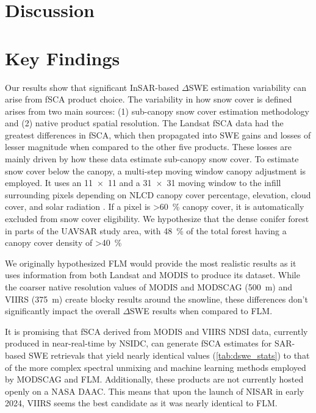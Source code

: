 \hypertarget{ch5-discussion}{\section{Discussion}\label{ch4-discussion}}
\hypertarget{ch5-discussion-1}{\section{Key Findings}\label{ch4-discussion}}

Our results show that significant InSAR-based $\Delta$SWE estimation variability can arise from fSCA product choice. The variability in how snow cover is defined arises from two main sources: (1) sub-canopy snow cover estimation methodology and (2) native product spatial resolution. The Landsat fSCA data had the greatest differences in fSCA, which then propagated into SWE gains and losses of lesser magnitude when compared to the other five products. These losses are mainly driven by how these data estimate sub-canopy snow cover. To estimate snow cover below the canopy, a multi-step moving window canopy adjustment is employed. It uses an 11~$\times$~11 and a 31~$\times$~31 moving window to the infill surrounding pixels depending on NLCD canopy cover percentage, elevation, cloud cover, and solar radiation \citep{selkowitzUSGSLandsatSnow2017}. If a pixel is >60~\% canopy cover, it is automatically excluded from snow cover eligibility. We hypothesize that the dense conifer forest in parts of the UAVSAR study area, with 48~\% of the total forest having a canopy cover density of >40~\%


We originally hypothesized FLM would provide the most realistic results as it uses information from both Landsat and MODIS to produce its dataset. While the coarser native resolution values of MODIS and MODSCAG (500~m) and VIIRS (375~m) create blocky results around the snowline, these differences don't significantly impact the overall $\Delta$SWE results when compared to FLM. 

It is promising that fSCA derived from MODIS and VIIRS NDSI data, currently produced in near-real-time by NSIDC, can generate fSCA estimates for SAR-based SWE retrievals that yield nearly identical values (\ref{tab:dswe_stats}) to that of the more complex spectral unmixing and machine learning methods employed by MODSCAG and FLM. Additionally, these products are not currently hosted openly on a NASA DAAC. This means that upon the launch of NISAR in early 2024, VIIRS seems the best candidate as it was nearly identical to FLM.

